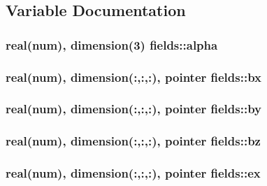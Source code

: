 \subsection{Variable Documentation}
\subsubsection[{\texorpdfstring{alpha}{alpha}}]{\setlength{\rightskip}{0pt plus 5cm}real(num), dimension(3) fields\+::alpha}\hypertarget{namespacefields_a123e475dfb74b9d51f0cefd3aa32f4ef}{}\label{namespacefields_a123e475dfb74b9d51f0cefd3aa32f4ef}
\subsubsection[{\texorpdfstring{bx}{bx}}]{\setlength{\rightskip}{0pt plus 5cm}real(num), dimension(\+:,\+:,\+:), pointer fields\+::bx}\hypertarget{namespacefields_ae5c4690c74e129bc786b6880e43e5263}{}\label{namespacefields_ae5c4690c74e129bc786b6880e43e5263}
\subsubsection[{\texorpdfstring{by}{by}}]{\setlength{\rightskip}{0pt plus 5cm}real(num), dimension(\+:,\+:,\+:), pointer fields\+::by}\hypertarget{namespacefields_a945637961cd81816fb389b3aff1bcdc6}{}\label{namespacefields_a945637961cd81816fb389b3aff1bcdc6}
\subsubsection[{\texorpdfstring{bz}{bz}}]{\setlength{\rightskip}{0pt plus 5cm}real(num), dimension(\+:,\+:,\+:), pointer fields\+::bz}\hypertarget{namespacefields_aaf0c4459b6c5caf1375fef4b33801e86}{}\label{namespacefields_aaf0c4459b6c5caf1375fef4b33801e86}
\subsubsection[{\texorpdfstring{ex}{ex}}]{\setlength{\rightskip}{0pt plus 5cm}real(num), dimension(\+:,\+:,\+:), pointer fields\+::ex}\hypertarget{namespacefields_a4b459092bf44b6c1e18d38c5b67ffdd8}{}\label{namespacefields_a4b459092bf44b6c1e18d38c5b67ffdd8}
